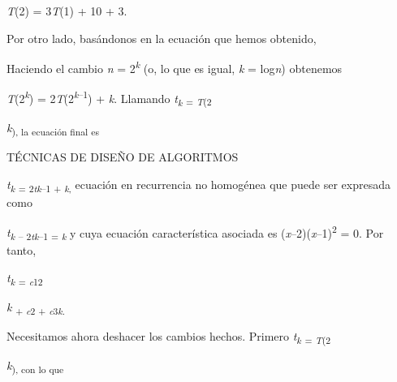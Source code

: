 \documentclass[12pt]{article}
\renewcommand{\_}{\kern-1.5pt\textunderscore\kern-1.5pt}
\begin{document}
{\fontsize{10pt}{12.0pt}\selectfont \textit{T}(2) = 3\textit{T}(1) + 10 + 3. \par}\par

{\fontsize{10pt}{12.0pt}\selectfont Por otro lado, basándonos en la ecuación que hemos obtenido, \par}\par


\vspace{\baselineskip}
{\fontsize{10pt}{12.0pt}\selectfont Haciendo el cambio \textit{n }= 2\textit{\textsuperscript{k }}(o, lo que es igual, \textit{k }= log\textit{n}) obtenemos \par}\par

{\fontsize{10pt}{12.0pt}\selectfont \textit{T}(2\textit{\textsuperscript{k}}) = 2\textit{T}(2\textit{\textsuperscript{k}}\textsuperscript{–1}) + \textit{k}. Llamando \textit{t\textsubscript{k }}\textsubscript{= \textit{T}(2}{\fontsize{7pt}{8.4pt}\selectfont \textit{k}\textsubscript{), la ecuación final es }\par}\par}\par

{\fontsize{10pt}{12.0pt} {\fontsize{7pt}{8.4pt}\selectfont TÉCNICAS DE DISEÑO DE ALGORITMOS \par}\par}\par

\begin{Center}
{\fontsize{10pt}{12.0pt}\selectfont \textit{t\textsubscript{k }}\textsubscript{= 2\textit{tk}–1 + \textit{k}, }ecuación en recurrencia no homogénea que puede ser expresada como \par}
\end{Center}\par

\begin{Center}
{\fontsize{10pt}{12.0pt}\selectfont \textit{t\textsubscript{k }}\textsubscript{– 2\textit{tk}–1 = \textit{k }}y cuya ecuación característica asociada es (\textit{x}–2)(\textit{x}–1)\textsuperscript{2 }= 0. Por tanto, \par}
\end{Center}\par

\begin{Center}
{\fontsize{10pt}{12.0pt}\selectfont \textit{t\textsubscript{k }}\textsubscript{= \textit{c}12}{\fontsize{7pt}{8.4pt}\selectfont \textit{k }\textsubscript{+ \textit{c}2 + \textit{c}3\textit{k}. }{\fontsize{10pt}{12.0pt}\selectfont Necesitamos ahora deshacer los cambios hechos. Primero \textit{t\textsubscript{k }}\textsubscript{= \textit{T}(2}{\fontsize{7pt}{8.4pt}\selectfont \textit{k}\textsubscript{), con lo que }\par}\par}\par}\par}
\end{Center}\par
\end{document}
